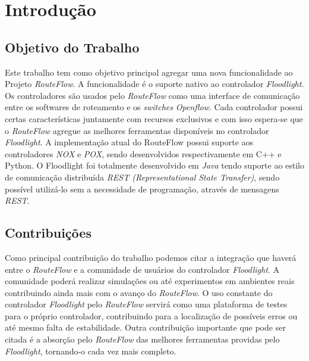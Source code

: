 \chapter{Introdução}

\section{Objetivo do Trabalho}
Este trabalho tem como objetivo principal agregar uma
 nova funcionalidade ao Projeto \textit{RouteFlow}. A 
funcionalidade é o suporte nativo ao controlador 
\textit{Floodlight}. Os controladores são usados 
pelo 
\textit{RouteFlow} como uma interface de comunicação
 entre os softwares de roteamento e os \textit{switches} 
\textit{Openflow}. Cada controlador possui certas
 características juntamente com recursos exclusivos e 
com isso espera-se que o \textit{RouteFlow} agregue
 as melhores ferramentas disponíveis no controlador 
\textit{Floodlight}.
 A implementação atual do RouteFlow possui suporte
 aos controladores \textit{NOX} e \textit{POX}, sendo 
desenvolvidos respectivamente em C++ e Python. O
 Floodlight foi totalmente desenvolvido em \textit{Java} 
tendo suporte ao estilo de comunicação distribuída
 \textit{REST (Representational State Transfer)}, 
sendo possível utilizá-lo sem a necessidade de programação,
  através de mensagens \textit{REST}.

\section{Contribuições}
Como principal contribuição do trabalho podemos citar
 a integração que haverá entre o \textit{RouteFlow} 
e a comunidade de usuários do controlador \textit{Floodlight}. 
A comunidade poderá realizar simulações 
ou até experimentos em ambientes reais contribuindo ainda
 mais com o avanço do \textit{RouteFlow}. O uso
constante do controlador \textit{Floodlight} pelo
 \textit{RouteFlow} servirá como uma plataforma de testes
para o próprio controlador, contribuindo para a localização de
 possíveis erros ou até mesmo falta de estabilidade.
Outra 
contribuição importante que pode ser citada é a absorção pelo
  \textit{RouteFlow} das melhores 
ferramentas providas pelo \textit{Floodlight}, tornando-o
 cada vez mais completo.  
